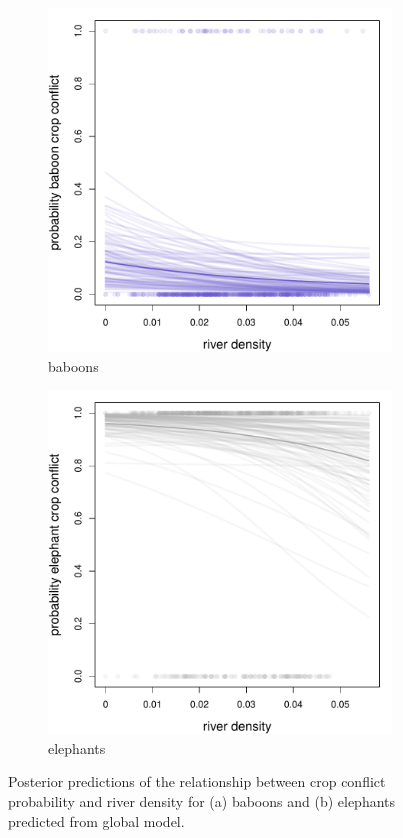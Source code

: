 \documentclass[12pt,]{article}
\begin{document}
\begin{figure}[H]
  \centering
	\begin{subfigure}[b]{0.49\textwidth}
	\includegraphics[width=\textwidth]{Figures/river_crop_global_conflict_bab.pdf} 
    \caption{baboons}
   	    \label{fig:cropRIVbab}
\end{subfigure}
\begin{subfigure}[b]{0.49\textwidth}
	\includegraphics[width=\textwidth]{Figures/river_crop_global_conflict_ele.pdf}  
    \caption{elephants}
  	\label{fig:cropRIVele}
\end{subfigure}
\caption{Posterior predictions of the relationship between crop conflict probability and river density for (a) baboons and (b) elephants predicted from global model.}
\end{figure}
\end{document}
